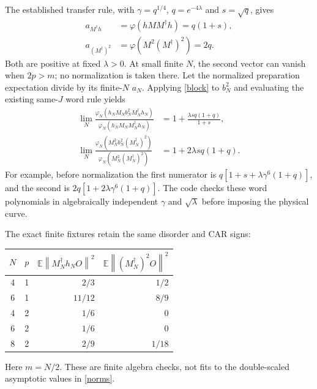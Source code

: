 \documentclass[11pt]{article}
\newcommand{\E}{\mathbb E}
\newcommand{\norm}[1]{\left\lVert#1\right\rVert}
\begin{document}
The established transfer rule, with
$\gamma=q^{1/4}$, $q=e^{-4\lambda}$ and $s=\sqrt q$, gives
\begin{align}
 a_{M^\dagger h}&=\varphi(hMM^\dagger h)=q(1+s),\\
 a_{(M^\dagger)^2}&=\varphi(M^2(M^\dagger)^2)=2q.\label{norms}
\end{align}
Both are positive at fixed $\lambda>0$. At small finite $N$, the
second vector can vanish when $2p>m$; no normalization is taken there.
Let the normalized preparation expectation divide by its finite-$N$
$a_N$. Applying \eqref{block} to $b_N^2$ and evaluating the existing
same-$J$ word rule yields
\begin{align}
 \lim_N\frac{\varphi_N(h_NM_Nb_N^2M_N^\dagger h_N)}
                  {\varphi_N(h_NM_NM_N^\dagger h_N)}
 &=1+\frac{\lambda s q(1+q)}{1+s},\label{quad1}\\
 \lim_N\frac{\varphi_N(M_N^2b_N^2(M_N^\dagger)^2)}
                  {\varphi_N(M_N^2(M_N^\dagger)^2)}
 &=1+2\lambda s q(1+q).\label{quad2}
\end{align}
For example, before normalization the first numerator is
$q[1+s+\lambda\gamma^6(1+q)]$, and the second is
$2q[1+2\lambda\gamma^6(1+q)]$. The code checks these word
polynomials in algebraically independent $\gamma$ and
$\sqrt\lambda$ before imposing the physical curve.

The exact finite fixtures retain the same disorder and CAR signs:
\begin{center}
\begin{tabular}{ccrr}
\toprule
$N$ & $p$ & $\E\norm{M_N^\dagger h_NO}^2$
          & $\E\norm{(M_N^\dagger)^2O}^2$\\\midrule
4&1&$2/3$&$1/2$\\
6&1&$11/12$&$8/9$\\
4&2&$1/6$&$0$\\
6&2&$1/6$&$0$\\
8&2&$2/9$&$1/18$\\\bottomrule
\end{tabular}
\end{center}
Here $m=N/2$. These are finite algebra checks, not fits to the
double-scaled asymptotic values in \eqref{norms}.

\newpage
\end{document}
